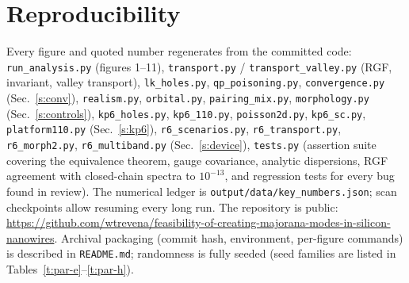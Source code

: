 \documentclass[11pt]{article}
\begin{document}
\section{Reproducibility}\label{s:repro}
Every figure and quoted number regenerates from the committed code:
\texttt{run\_analysis.py} (figures 1--11), \texttt{transport.py} /
\texttt{transport\_valley.py} (RGF, invariant, valley transport),
\texttt{lk\_holes.py}, \texttt{qp\_poisoning.py},
\texttt{convergence.py} (Sec.~\ref{s:conv}), \texttt{realism.py},
\texttt{orbital.py}, \texttt{pairing\_mix.py}, \texttt{morphology.py}
(Sec.~\ref{s:controls}), \texttt{kp6\_holes.py}, \texttt{kp6\_110.py},
\texttt{poisson2d.py}, \texttt{kp6\_sc.py}, \texttt{platform110.py}
(Sec.~\ref{s:kp6}), \texttt{r6\_scenarios.py}, \texttt{r6\_transport.py},
\texttt{r6\_morph2.py}, \texttt{r6\_multiband.py} (Sec.~\ref{s:device}),
\texttt{tests.py} (assertion suite covering the equivalence theorem,
gauge covariance, analytic dispersions, RGF agreement with closed-chain
spectra to $10^{-13}$, and regression tests for every bug found in
review). The numerical ledger is \texttt{output/data/key\_numbers.json};
scan checkpoints allow resuming every long run. The repository is public:
\url{https://github.com/wtrevena/feasibility-of-creating-majorana-modes-in-silicon-nanowires}. Archival packaging
(commit hash, environment, per-figure commands) is described in
\texttt{README.md}; randomness is fully seeded (seed families are listed
in Tables~\ref{t:par-e}--\ref{t:par-h}).
\end{document}
